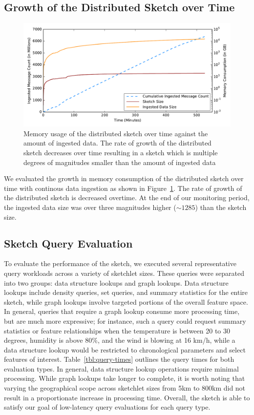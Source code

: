 \subsection{Growth of the Distributed Sketch over Time}
\begin{figure}[h]
    \centerline{\includegraphics[width=\linewidth]{figures/ing-and-mem-usage.pdf}}
    \caption{Memory usage of the distributed sketch over time against the amount of ingested data. The rate of growth of the distributed sketch decreases over time resulting in a sketch which is multiple degrees of magnitudes smaller than the amount of ingested data}
    \label{fig:dist-sketch-mem-usage}
\end{figure}
We evaluated the growth in memory consumption of the distributed sketch over time with continous data ingestion as shown in Figure~\ref{fig:dist-sketch-mem-usage}.
The rate of growth of the distributed sketch is decreased overtime.
At the end of our monitoring period, the ingested data size was over three magnitudes higher ($\sim 1285$) than the sketch size. 


\subsection{Sketch Query Evaluation}
To evaluate the performance of the sketch, we executed several representative query workloads across a variety of sketchlet sizes. These queries were separated into two groups: data structure lookups and graph lookups. Data structure lookups include density queries, set queries, and summary statistics for the entire sketch, while graph lookups involve targeted portions of the overall feature space. In general, queries that require a graph lookup consume more processing time, but are much more expressive; for instance, such a query could request summary statistics or feature relationships when the temperature is between 20 to 30 degrees, humidity is above 80\%, and the wind is blowing at 16 km/h, while a data structure lookup would be restricted to chronological parameters and select features of interest. Table~\ref{tbl:query-times} outlines the query times for both evaluation types. In general, data structure lookup operations require minimal processing. While graph lookups take longer to complete, it is worth noting that varying the geographical scope across sketchlet sizes from 5km to 800km did not result in a proportionate increase in processing time. Overall, the sketch is able to satisfy our goal of low-latency query evaluations for each query type.

